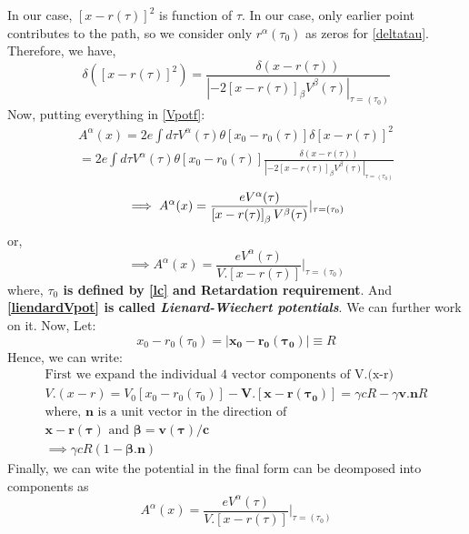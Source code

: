 \documentclass[12pt]{report}
\newcommand{\mbf}[1]{\mathbf{#1}}
\newcommand{\tit}[1]{\textit{#1}}
\newcommand{\rr}[1]{\left[{#1}\right]}
\begin{document}
In our case, $\rr{x-r(\tau)}^2$ is function of $\tau$. In our case, only earlier point contributes to the path, so we consider only $r^\alpha(\tau_0)$ as zeros for \eqref{deltatau}.\\
Therefore, we have,
\begin{equation}\label{deltatau}
\delta([x-r(\tau)]^2)= \frac{\delta(x-r(\tau))}{|-2\rr{x-r(\tau)}_\beta V^\beta(\tau)|_{\tau=(\tau_0)}}
\end{equation}
Now, putting everything in \eqref{Vpotf}:
\begin{eqnarray*}
A^\alpha(x)=2e\int d\tau V^\alpha(\tau)\theta\rr{x_0-r_0(\tau)}\delta\rr{x-r(\tau)}^2\\
=2e\int d\tau V^\alpha(\tau)\theta\rr{x_0-r_0(\tau)}\frac{\delta(x-r(\tau))}{|-2\rr{x-r(\tau)}_\beta V^\beta(\tau)|_{\tau=(\tau_0)}}
\end{eqnarray*}
\begin{equation}
\implies A^\alpha(x)=\frac{e V^\alpha(\tau)}{\rr{x-r(\tau)}_\beta V^\beta(\tau)}|_{\tau=(\tau_0)}\\
\end{equation}
or,
\begin{equation}\label{liendardVpot}
\implies A^\alpha(x)=\frac{e V^\alpha(\tau)}{V . \rr{x-r(\tau)}}|_{\tau=(\tau_0)}
\end{equation}
where, \textbf{$\tau_0$ is defined by \eqref{lc} and Retardation requirement}. And \textbf{\eqref{liendardVpot} is called \tit{Lienard-Wiechert potentials}}.
We can further work on it. Now, Let:
\begin{equation}
x_0-r_0(\tau_0) = \mbf{|x_0-r_0(\tau_0)|} \equiv R
\end{equation}
Hence,
we can write:
\begin{eqnarray*}
\text{First we expand the individual 4 vector components of V.(x-r)}\\
V.(x-r)=V_0\rr{x_0-r_0(\tau_0)}-\mbf{V.\rr{x-r(\tau_0)}}
=\gamma cR-\gamma\mbf{v.n}R\\
\text{where, $\mbf{n}$ is a unit vector in the direction of}\\
\text{$\mbf{x-r(\tau)}$ and $\mbf{\beta=v(\tau)/c}$}\\
\implies \gamma c R(1-\mbf{\beta .n})
\end{eqnarray*}
Finally, we can wite the potential in the final form can be deomposed into components as
\begin{equation*}
 A^\alpha(x)=\frac{e V^\alpha(\tau)}{V . \rr{x-r(\tau)}}|_{\tau=(\tau_0)}
\end{equation*}
\end{document}
